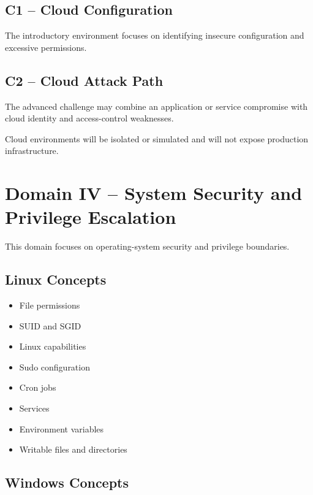 \documentclass[11pt,a4paper]{article}
\begin{document}
\subsection{C1 -- Cloud Configuration}

The introductory environment focuses on identifying insecure
configuration and excessive permissions.


\subsection{C2 -- Cloud Attack Path}

The advanced challenge may combine an application or service
compromise with cloud identity and access-control weaknesses.

Cloud environments will be isolated or simulated and will not expose
production infrastructure.



\section{Domain IV -- System Security and Privilege Escalation}

This domain focuses on operating-system security and privilege
boundaries.

\subsection{Linux Concepts}

\begin{itemize}

    \item File permissions
    \item SUID and SGID
    \item Linux capabilities
    \item Sudo configuration
    \item Cron jobs
    \item Services
    \item Environment variables
    \item Writable files and directories

\end{itemize}


\subsection{Windows Concepts}
\end{document}
